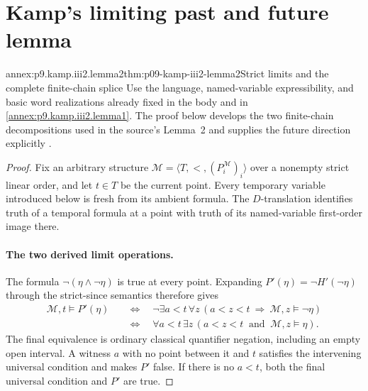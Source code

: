 
\section{Kamp's limiting past and future lemma}
\label{sec:annex-p09-kamp-iii2-lemma2}

\begin{annexitem}{annex:p9.kamp.iii2.lemma2}{thm:p09-kamp-iii2-lemma2}{Strict limits and the complete finite-chain splice}
Use the language, named-variable expressibility, and basic word realizations
already fixed in the body and in \cref{annex:p9.kamp.iii2.lemma1}.
The proof below develops the two finite-chain decompositions used in the
source's Lemma~2 and supplies the future direction explicitly
\cite[ch.~III, pp.~57--59, 63--67, 70--73]{Kamp1968}.

\begin{proof}
Fix an arbitrary structure
\(\mathcal M=\langle T,<,(P_i^{\mathcal M})_i\rangle\) over a nonempty
strict linear order, and let \(t\in T\) be the current point.
Every temporary variable introduced below is fresh from its ambient formula.
The \(D\)-translation identifies truth of a temporal formula at a point
with truth of its named-variable first-order image there.

\paragraph{The two derived limit operations.}
The formula \(\neg(\eta\land\neg\eta)\) is true at every point.
Expanding \(P'(\eta)=\neg H'(\neg\eta)\) through the strict-since
semantics therefore gives
\[
\begin{split}
 \mathcal M,t\models P'(\eta)
 &\quad\Longleftrightarrow\quad
 \neg\exists a<t\,\forall z\,
       (a<z<t\ \Rightarrow\ \mathcal M,z\models\neg\eta)\\
 &\quad\Longleftrightarrow\quad
 \forall a<t\,\exists z\,
       (a<z<t\ \text{ and }\ \mathcal M,z\models\eta).
\end{split}
\tag{1}
\]
The final equivalence is ordinary classical quantifier negation, including
an empty open interval.  A witness \(a\) with no point between it and
\(t\) satisfies the intervening universal condition and makes \(P'\)
false.  If there is no \(a<t\), both the final universal condition and
\(P'\) are true.


\end{proof}
\end{annexitem}
